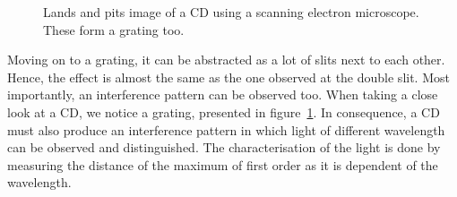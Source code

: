 \begin{minipage}{0.99\linewidth}
\begin{minipage}{0.25\linewidth}
\begin{scriptsize}
\begin{center}
\begin{figure}[H]
                    \caption{Lands and pits image of a CD using a scanning electron microscope. These form a grating too.}
                    \label{fig_lands_pits}
                \end{figure}
            \end{center}
            \end{scriptsize}
        \end{minipage}
    \end{minipage}

    Moving on to a grating, it can be abstracted as a lot of slits next to each other.
    Hence, the effect is almost the same as the one observed at the double slit.
    Most importantly, an interference pattern can be observed too.
    When taking a close look at a CD, we notice a grating, presented in figure~\ref{fig_lands_pits}.
    In consequence, a CD must also produce an interference pattern in which light of different wavelength can be observed and distinguished.
    The characterisation of the light is done by measuring the distance of the maximum of first order as it is dependent of the wavelength.

